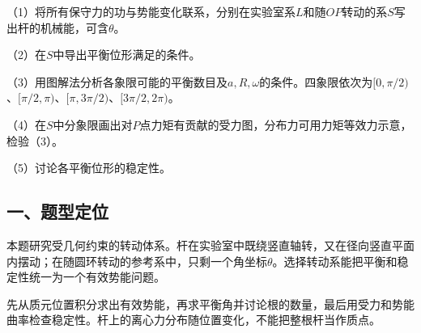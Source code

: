 \documentclass[12pt,a4paper,fontset=fandol]{ctexart}
\begin{document}
\begin{center}
\begin{minipage}{\linewidth}
\centering\begingroup{}
\ifdim\wd\diagrambox>.88\linewidth
\sbox{\diagrambox}{\resizebox{.88\linewidth}{!}{\usebox{\diagrambox}}}\fi
\ifdim\ht\diagrambox>.38\textheight
\resizebox{!}{.38\textheight}{\usebox{\diagrambox}}
\else\usebox{\diagrambox}\fi
\par{}\endgroup\end{minipage}\end{center}

（1）将所有保守力的功与势能变化联系，分别在实验室系\(L\)和随\(OP\)转动的系\(S\)写出杆的机械能，可含\(\theta\)。

（2）在\(S\)中导出平衡位形满足的条件。

（3）用图解法分析各象限可能的平衡数目及\(a,R,\omega\)的条件。四象限依次为\([0,\pi/2)\)、\([\pi/2,\pi)\)、\([\pi,3\pi/2)\)、\([3\pi/2,2\pi)\)。

（4）在\(S\)中分象限画出对\(P\)点力矩有贡献的受力图，分布力可用力矩等效力示意，检验（3）。

（5）讨论各平衡位形的稳定性。

\subsection{一、题型定位}\label{ux4e00ux9898ux578bux5b9aux4f4d-3}

本题研究受几何约束的转动体系。杆在实验室中既绕竖直轴转，又在径向竖直平面内摆动；在随圆环转动的参考系中，只剩一个角坐标\(\theta\)。选择转动系能把平衡和稳定性统一为一个有效势能问题。

先从质元位置积分求出有效势能，再求平衡角并讨论根的数量，最后用受力和势能曲率检查稳定性。杆上的离心力分布随位置变化，不能把整根杆当作质点。
\end{document}
